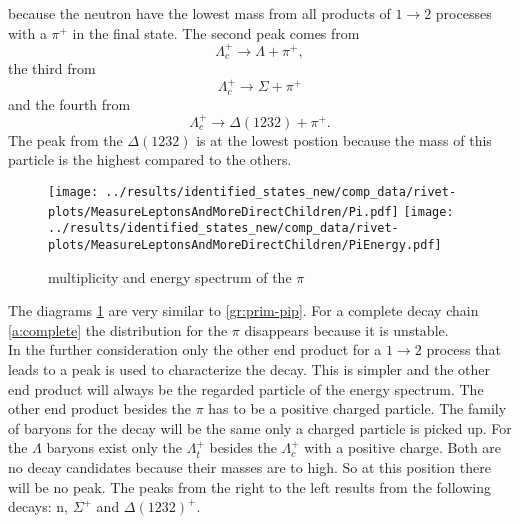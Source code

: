 because the neutron have the lowest mass from all products of \( 1 \rightarrow 2 \) 
processes with a \(\pi^+\) in the final state. The second peak comes from 
\begin{equation}
  \Lambda_c^+ \rightarrow \Lambda + \pi^+, \nonumber
\end{equation}
the third from 
\begin{equation}
  \Lambda_c^+ \rightarrow \Sigma + \pi^+ \nonumber
\end{equation}
and the fourth from 
\begin{equation}
  \Lambda_c^+ \rightarrow \Delta(1232) + \pi^+. \nonumber
\end{equation}
The peak from the \(\Delta(1232)\) is at the lowest postion because the mass of 
this particle is the highest compared to the others.\\

\begin{figure}[h]
  \centering
  \texttt{[image: ../results/identified\_states\_new/comp\_data/rivet-plots/MeasureLeptonsAndMoreDirectChildren/Pi.pdf]}
  \texttt{[image: ../results/identified\_states\_new/comp\_data/rivet-plots/MeasureLeptonsAndMoreDirectChildren/PiEnergy.pdf]}
  \caption{multiplicity and energy spectrum of the \(\pi\)} \label{gr:prim-pi}
\end{figure}
The diagrams {\ref{gr:prim-pi}} are very similar to {\ref{gr:prim-pip}}. For a 
complete decay chain {\ref{a:complete}} the distribution for the \(\pi\) 
disappears because it is unstable.\\
In the further consideration only the other end product for a \( 1 \rightarrow 2 \) process
that leads to a peak is used to characterize the decay. This is simpler and the 
other end product will always be the regarded particle of the energy spectrum. 
The other end product besides the \(\pi\) has to be a positive charged particle. 
The family of baryons for the decay will be the same only a charged particle is 
picked up. For the \(\Lambda\) baryons exist only the \(\Lambda_t^+\) besides 
the \(\Lambda_c^+\) with a positive charge. Both are no decay candidates because 
their masses are to high. So at this position there will be no peak. The 
peaks from the right to the left results from the following decays:
n, \(\Sigma^+\) and \(\Delta(1232)^+\).\\

